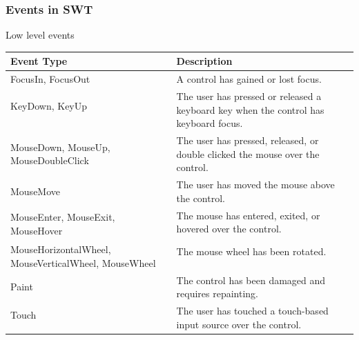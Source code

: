 \subsubsection{Events in SWT}
\cite{swtevent}
\begin{center}
Low level events
\begin{tabular}{l|l}
Event Type & Description\\
\hline
FocusIn, FocusOut & A control has gained or lost focus.\\
KeyDown, KeyUp & \multirow{2}{*}{\parbox{10cm}{The user has pressed or released a keyboard key when the control has keyboard focus.}}\\
&\\
\multirow{2}{*}{\parbox{4.5cm}{MouseDown, MouseUp, MouseDoubleClick}} & \multirow{2}{*}{\parbox{10cm}{The user has pressed, released, or double clicked the mouse over the control.}}\\
&\\
MouseMove & The user has moved the mouse above the control.\\
\multirow{2}{*}{\parbox{4.5cm}{MouseEnter, MouseExit, MouseHover}} & The mouse has entered, exited, or hovered over the control.\\
&\\
\multirow{3}{*}{\parbox{4.5cm}{MouseHorizontalWheel, MouseVerticalWheel, MouseWheel}} & The mouse wheel has been rotated.\\
&\\
&\\
Paint & The control has been damaged and requires repainting.\\
Touch & \multirow{2}{*}{\parbox{10cm}{The user has touched a touch-based input source over the control.}}\\
&\\
\end{tabular}
\end{center}
\newpage
